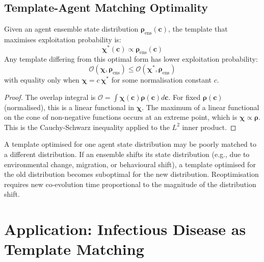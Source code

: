 \documentclass[11pt,twocolumn,a4paper]{article}
\newcommand{\Template}{\boldsymbol{\chi}}
\newcommand{\State}{\boldsymbol{\rho}}
\newcommand{\Overlap}{\mathcal{O}}
\begin{document}
\subsection{Template-Agent Matching Optimality}

\begin{theorem}
\label{thm:bestfit}
Given an agent ensemble state distribution $\State_{\mathrm{ens}}(\mathbf{c})$, the template that maximises exploitation probability is:
\begin{equation}
\Template^*(\mathbf{c}) \propto \State_{\mathrm{ens}}(\mathbf{c})
\label{eq:bestfit_template}
\end{equation}
Any template differing from this optimal form has lower exploitation probability:
\begin{equation}
\Overlap(\Template, \State_{\mathrm{ens}}) \le \Overlap(\Template^*, \State_{\mathrm{ens}})
\label{eq:optimality_bound}
\end{equation}
with equality only when $\Template = c \, \Template^*$ for some normalisation constant $c$.
\end{theorem}

\begin{proof}
The overlap integral is $\mathcal{O} = \int \Template(\mathbf{c}) \State(\mathbf{c}) d\mathbf{c}$. For fixed $\State(\mathbf{c})$ (normalised), this is a linear functional in $\Template$. The maximum of a linear functional on the cone of non-negative functions occurs at an extreme point, which is $\Template \propto \State$. This is the Cauchy-Schwarz inequality applied to the $L^2$ inner product.
\end{proof}

\begin{corollary}
A template optimised for one agent state distribution may be poorly matched to a different distribution. If an ensemble shifts its state distribution (e.g., due to environmental change, migration, or behavioural shift), a template optimised for the old distribution becomes suboptimal for the new distribution. Reoptimisation requires new co-evolution time proportional to the magnitude of the distribution shift.
\end{corollary}

\section{Application: Infectious Disease as Template Matching}
\label{sec:disease_application}
\end{document}
